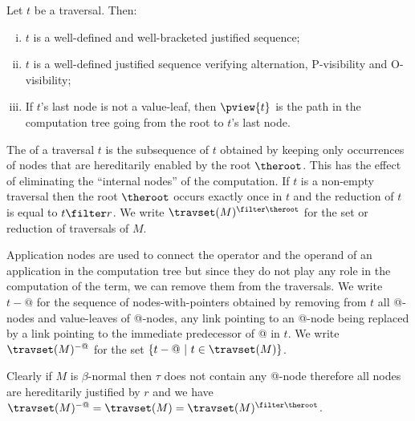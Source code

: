 \begin{proposition}
\label{prop:pviewtrav_is_path}
Let $t$ be a traversal. Then:
\begin{enumerate}[(i)]
\item $t$ is a well-defined and well-bracketed justified sequence;
\item $t$ is a well-defined justified sequence verifying alternation, P-visibility and O-visibility;
\item If $t$'s last node is not a value-leaf, then $\pview{t}$ is the path in the computation tree going from the root to $t$'s last node.
\end{enumerate}
\end{proposition}

The  of a traversal $t$ is the subsequence of $t$
obtained by keeping only occurrences of nodes that are hereditarily
enabled by the root $\theroot$. This has the effect of eliminating
the ``internal nodes'' of the computation. If $t$ is a non-empty
traversal then the root $\theroot$ occurs exactly once in $t$ and
the reduction of $t$ is equal to $t \filter r$. We write
$\travset(M)^{\filter \theroot}$ for the set or reduction of
traversals of $M$.

Application nodes are used to connect the operator and the operand
of an application in the computation tree but since they do not play
any role in the computation of the term, we can remove them from the
traversals.  We write $t-@$ for the sequence of nodes-with-pointers
obtained by removing from $t$ all @-nodes and value-leaves of
@-nodes, any link pointing to an @-node being replaced by a link
pointing to the immediate predecessor of @ in $t$. We write
$\travset(M)^{-@}$ for the set $\{ t - @ \ | \  t \in \travset(M)
\}$.
\begin{remark}
Clearly if $M$ is $\beta$-normal then $\tau$ does not contain any
@-node therefore all nodes are hereditarily justified by $r$ and we
have $\travset(M)^{-@} = \travset(M) = \travset(M)^{\filter \theroot
}$.
\end{remark}



